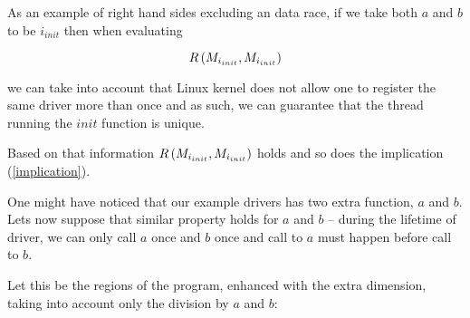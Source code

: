 \documentclass[..thesis.tex]{subfiles}
\begin{document}
As an example of right hand sides excluding an data race, if we take both $a$ and $b$ to be $i_{init}$ then when evaluating 

\begin{equation*}
R \left( M_{i_{init}}, M_{i_{init}} \right)
\end{equation*} 

we can take into account that Linux kernel does not allow one to register the same driver more than once and as such,
 we can guarantee that the thread running the $init$ function is unique.

Based on that information $R \left( M_{i_{init}}, M_{i_{init}} \right)$ holds and so does the implication (\ref{implication}).


One might have noticed that our example drivers has two extra function, $a$ and $b$. Lets now suppose that similar property holds for $a$ and $b$ --
 during the lifetime of driver, we can only call $a$ once and $b$ once and call to $a$  must happen before call to $b$.

Let this be the regions of the program, enhanced with the extra dimension, taking into account only the division by $a$ and $b$:



\end{document}

